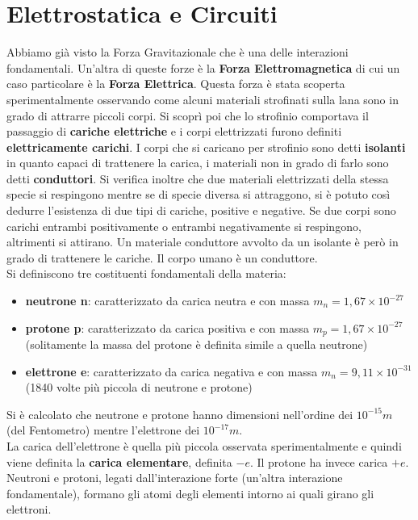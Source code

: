 \documentclass[a4paper,12pt, oneside]{book}
\begin{document}
\chapter{Elettrostatica e Circuiti}
Abbiamo già visto la Forza Gravitazionale che è una delle interazioni fondamentali. Un'altra di queste forze è la\textbf{ Forza Elettromagnetica} di cui un caso particolare è la \textbf{Forza Elettrica}. Questa forza è stata scoperta sperimentalmente osservando come alcuni materiali strofinati sulla lana sono in grado di attrarre piccoli corpi. Si scoprì poi che lo strofinio comportava il passaggio di \textbf{cariche elettriche} e i corpi elettrizzati furono definiti  \textbf{elettricamente carichi}. I corpi che si caricano per strofinio sono detti \textbf{isolanti} in quanto capaci di trattenere la carica, i materiali non in grado di farlo sono detti \textbf{conduttori}. Si verifica inoltre che due materiali elettrizzati della stessa specie si respingono mentre se di specie diversa si attraggono, si è potuto così dedurre l'esistenza di due tipi di cariche, positive e negative. Se due corpi sono carichi entrambi positivamente o entrambi negativamente si respingono, altrimenti si attirano. Un materiale conduttore avvolto da un isolante è però in grado di trattenere le cariche. Il corpo umano è un conduttore.\\
Si definiscono tre costituenti fondamentali della materia:
\begin{itemize}
	\item \textbf{neutrone n}: caratterizzato da carica neutra e con massa $m_n=1,67\times 10^{-27}$
	\item \textbf{protone p}: caratterizzato da carica positiva e con massa $m_p=1,67\times 10^{-27}$ (solitamente la massa del protone è definita simile a quella neutrone)
	\item \textbf{elettrone e}: caratterizzato da carica negativa e con massa $m_n=9,11\times 10^{-31}$ (1840 volte più piccola di neutrone e protone)
\end{itemize}
Si è calcolato che neutrone e protone hanno dimensioni nell'ordine dei $10^{-15}m$ (del Fentometro) mentre l'elettrone  dei $10^{-17}m$.\\
La carica dell'elettrone è quella più piccola osservata sperimentalmente e quindi viene definita la \textbf{carica elementare}, definita $-e$. Il protone ha invece carica $+e$. Neutroni e protoni, legati dall'interazione forte (un'altra interazione fondamentale), formano gli atomi degli elementi intorno ai quali girano gli elettroni.\\
\end{document}
